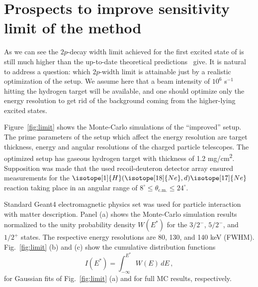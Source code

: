 \documentclass[superscriptaddress,showpacs,showkeys,twoside,floatfix,twocolumn]
{revtex4-1}
\begin{document}

\section{Prospects to improve sensitivity limit of the method}
\label{sec:prospects}


As we can see the $2p$-decay width limit achieved for the first excited state of
 is still much higher than
the up-to-date theoretical predictions~\cite{Grigorenko:2007,Garrido:2008} give.
It is natural to address a question:
which $2p$-width limit is attainable
just by a realistic optimization of the setup.
We assume here that a  beam intensity of \(10^6\) s$^{-1}$
hitting the hydrogen target will be available, and
one should optimize only the energy resolution to get rid of the background
coming from the higher-lying excited states.


Figure~\ref{fig:limit} shows the Monte-Carlo simulations of the ``improved'' setup.
The prime parameters of the setup which affect the energy resolution are
target thickness, energy and angular resolutions of the charged particle telescopes.
The optimized setup has gaseous hydrogen target with thickness of 1.2 mg/cm\textsuperscript{2}.
Supposition was made that the used recoil-deuteron detector array ensured measurements
for the $\isotope[1]{H}(\isotope[18]{Ne},d)\isotope[17]{Ne}$ reaction taking place
in an angular range of $8^\circ\le \theta_\mathrm{c.m.} \le 24^\circ$.

Standard Geant4 electromagnetic physics set
was used for particle interaction with matter description.
Panel (a) shows the Monte-Carlo simulation results normalized to the unity
probability density $W(E^*)$ for the $3/2^-$, $5/2^-$, and $1/2^+$ states.
The respective energy resolutions are 80, 130, and 140 keV (FWHM).
Fig.~\ref{fig:limit} (b) and (c) show the cumulative distribution functions
%
\[
  I(E^*) = \int_{-\infty}^{E^*} W(E) \, dE \,,
\]
%
for Gaussian fits of Fig.~\ref{fig:limit} (a) and for full MC results, respectively.
\end{document}
